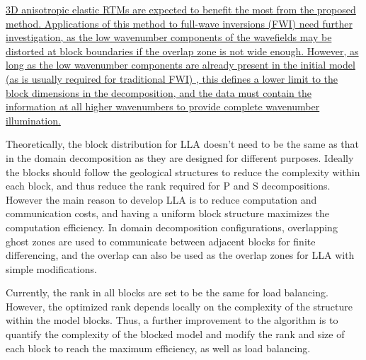 \documentclass[manuscript,ulem,graphix,revised]{geophysics}
\begin{document}
\marginnote{[3, 18, 19]}\uline{3D anisotropic elastic RTMs are expected to benefit the most from the proposed method. Applications of this method to full-wave inversions (FWI) need further investigation, as the low wavenumber components of the wavefields may be distorted at block boundaries if the overlap zone is not wide enough. However, as long as the low wavenumber components are already present in the initial model}\marginnote{[18]} \uline{(as is usually required for traditional FWI) \mbox{\citep{mora89}}, this defines a lower limit to the block dimensions in the decomposition, and the data must contain the information at all higher wavenumbers to provide complete wavenumber illumination.}

Theoretically, the block distribution for LLA doesn't need to be the same as that in the domain decomposition as they are designed for different purposes. Ideally the blocks should follow the geological structures to reduce the complexity within each block, and thus reduce the rank required for P and S decompositions. However the main reason to develop LLA is to reduce computation and communication costs, and having a uniform block structure maximizes the computation efficiency. In domain decomposition configurations, overlapping ghost zones are used to communicate between adjacent blocks for finite differencing, and the overlap can also be used as the overlap zones for LLA with simple modifications. 

Currently, the rank in all blocks are set to be the same for load balancing. However, the optimized rank depends locally on the complexity of the structure within the model blocks. Thus, a further improvement to the algorithm is to quantify the complexity of the blocked model and modify the rank and size of each block to reach the maximum efficiency, as well as load balancing.


\end{document}

